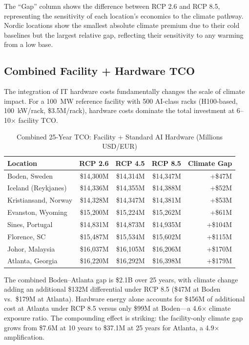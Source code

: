 \documentclass[12pt,a4paper]{article}
\begin{document}
The ``Gap'' column shows the difference between RCP 2.6 and RCP 8.5, representing the sensitivity of each location's economics to the climate pathway. Nordic locations show the smallest absolute climate premium due to their cold baselines but the largest relative gap, reflecting their sensitivity to any warming from a low base.

\subsection{Combined Facility + Hardware TCO}

The integration of IT hardware costs fundamentally changes the scale of climate impact. For a 100~MW reference facility with 500 AI-class racks (H100-based, 100~kW/rack, \$3.5M/rack), hardware costs dominate the total investment at 6--10$\times$ facility TCO.

\begin{table}[H]
\centering
\caption{Combined 25-Year TCO: Facility + Standard AI Hardware (Millions USD/EUR)}
\label{tab:combined_tco}
\small
\begin{tabular}{lrrrr}
\toprule
\textbf{Location} & \textbf{RCP 2.6} & \textbf{RCP 4.5} & \textbf{RCP 8.5} & \textbf{Climate Gap} \\
\midrule
Boden, Sweden       & \$14,300M & \$14,314M & \$14,347M & +\$47M \\
Iceland (Reykjanes) & \$14,336M & \$14,355M & \$14,388M & +\$52M \\
Kristiansand, Norway & \$14,328M & \$14,347M & \$14,381M & +\$53M \\
Evanston, Wyoming   & \$15,200M & \$15,224M & \$15,262M & +\$61M \\
Sines, Portugal     & \$14,831M & \$14,873M & \$14,935M & +\$104M \\
Florence, SC        & \$15,487M & \$15,534M & \$15,602M & +\$115M \\
Johor, Malaysia     & \$16,037M & \$16,105M & \$16,206M & +\$170M \\
Atlanta, Georgia    & \$16,220M & \$16,292M & \$16,398M & +\$179M \\
\bottomrule
\end{tabular}
\end{table}

The combined Boden--Atlanta gap is \$2.1B over 25 years, with climate change adding an additional \$132M differential under RCP 8.5 (\$47M at Boden vs.\ \$179M at Atlanta). Hardware energy alone accounts for \$456M of additional cost at Atlanta under RCP 8.5 versus only \$99M at Boden—a 4.6$\times$ climate exposure ratio. The compounding effect is striking: the facility-only climate gap grows from \$7.6M at 10 years to \$37.1M at 25 years for Atlanta, a 4.9$\times$ amplification.
\end{document}
